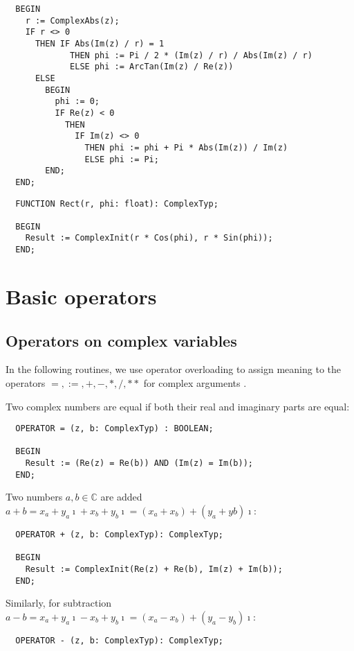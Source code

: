 \begin{refsection}
\begin{lstlisting}
  BEGIN
    r := ComplexAbs(z);
    IF r <> 0
      THEN IF Abs(Im(z) / r) = 1
             THEN phi := Pi / 2 * (Im(z) / r) / Abs(Im(z) / r)
             ELSE phi := ArcTan(Im(z) / Re(z))
      ELSE
        BEGIN
          phi := 0;
          IF Re(z) < 0
            THEN
              IF Im(z) <> 0
                THEN phi := phi + Pi * Abs(Im(z)) / Im(z)
                ELSE phi := Pi;
        END;
  END;
\end{lstlisting}

\begin{lstlisting}
  FUNCTION Rect(r, phi: float): ComplexTyp;

  BEGIN
    Result := ComplexInit(r * Cos(phi), r * Sin(phi));
  END;
\end{lstlisting}


\section{Basic operators}

\subsection{Operators on complex variables}

In the following routines, we use operator overloading to assign meaning to the operators \( =, :=, +, -, *, /, ** \) for complex arguments \parencite{Can-20}.

Two complex numbers are equal if both their real and imaginary parts are equal:
\begin{lstlisting}
  OPERATOR = (z, b: ComplexTyp) : BOOLEAN;

  BEGIN
    Result := (Re(z) = Re(b)) AND (Im(z) = Im(b));
  END;
\end{lstlisting}

Two numbers \(a, b \in \mathbb{C} \) are added \(a + b = x_a + y_a\imath + x_b + y_b \imath = (x_a + x_b) + (y_a + yb)\imath \):

\begin{lstlisting}
  OPERATOR + (z, b: ComplexTyp): ComplexTyp;

  BEGIN
    Result := ComplexInit(Re(z) + Re(b), Im(z) + Im(b));
  END;
\end{lstlisting}


Similarly, for subtraction \(a - b = x_a + y_a\imath - x_b + y_b \imath = (x_a - x_b) + (y_a - y_b)\imath \):
\begin{lstlisting}
  OPERATOR - (z, b: ComplexTyp): ComplexTyp;


\end{lstlisting}
\end{refsection}
